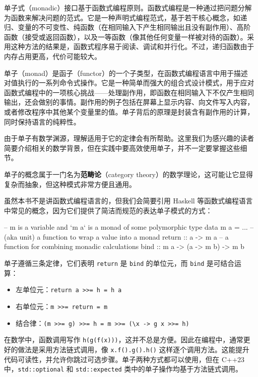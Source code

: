 \label{idx:473}
单子式（monadic）接口基于函数式编程原则。函数式编程是一种通过把问题分解为函数来解决问题的范式。它是一种声明式编程范式，基于若干核心概念，如递归、变量的不可变性、纯函数（在相同输入下产生相同输出且没有副作用）、高阶函数（接受或返回函数），以及一等函数（像其他任何变量一样被对待的函数）。采用这种方法的结果是，函数式程序易于阅读、调试和并行化。不过，递归函数由于内存占用更高，代价可能较大。

单子（monad）是函子（functor）的一个子类型，在函数式编程语言中用于描述对值执行的一系列命令式操作。它是一种简单而强大的组合式设计模式，用于应对函数式编程中的一项核心挑战——处理副作用，即函数在相同输入下不仅产生相同输出，还会做别的事情。副作用的例子包括在屏幕上显示内容、向文件写入内容，或者修改程序中其他某个变量里的值。单子背后的原理是封装含有副作用的计算，同时保持语言的纯粹性。

由于单子有数学渊源，理解适用于它的定律会有所帮助。这里我们为感兴趣的读者简要介绍相关的数学背景，但在实践中要高效使用单子，并不一定要掌握这些细节。

\label{idx:474}
单子的概念属于一门名为\textbf{范畴论}（category theory）的数学理论，这可能让它显得复杂而抽象，但这种模式非常方便且通用。

虽然本书不是讲函数式编程语言的，但我们会简要引用 Haskell 等函数式编程语言中常见的概念，因为它们提供了简洁而规范的表达单子模式的方式：

\begin{codebox}[text]
-- m is a variable and `m a` is a monad of some polymorphic type
data m a = ...
-- (aka unit) a function to wrap a value into a monad
return :: a -> m a
-- a function for combining monadic calculations
bind :: m a -> (a -> m b) -> m b
\end{codebox}

单子遵循三条定律，它们表明 \texttt{return} 是 \texttt{bind} 的单位元，而 \texttt{bind} 是可结合运算：

\begin{itemize}
\item 左单位元：\texttt{return a >>=\allowbreak{} h =\allowbreak{} h a}
\item 右单位元：\texttt{m >>=\allowbreak{} return =\allowbreak{} m}
\item 结合律：\texttt{(\allowbreak{}m >>=\allowbreak{} g)\allowbreak{} >>=\allowbreak{} h =\allowbreak{} m >>=\allowbreak{} (\allowbreak{}\textbackslash{}x -> g x >>=\allowbreak{} h)\allowbreak{}}
\end{itemize}

在数学中，函数调用写作 \texttt{h(\allowbreak{}g(\allowbreak{}f(\allowbreak{}x)\allowbreak{})\allowbreak{})\allowbreak{}}，这并不总是方便。因此在编程中，通常更好的做法是采用方法链式调用，像 \texttt{x.\allowbreak{}f(\allowbreak{})\allowbreak{}.\allowbreak{}g(\allowbreak{})\allowbreak{}.\allowbreak{}h(\allowbreak{})\allowbreak{}} 这样逐个调用方法。这能提升代码可读性，并允许你跳过可选步骤。单子两种方式都可以使用，但在 C++23 中，\texttt{std::\allowbreak{}optional} 和 \texttt{std::\allowbreak{}expected} 类中的单子操作均基于方法链式调用。

